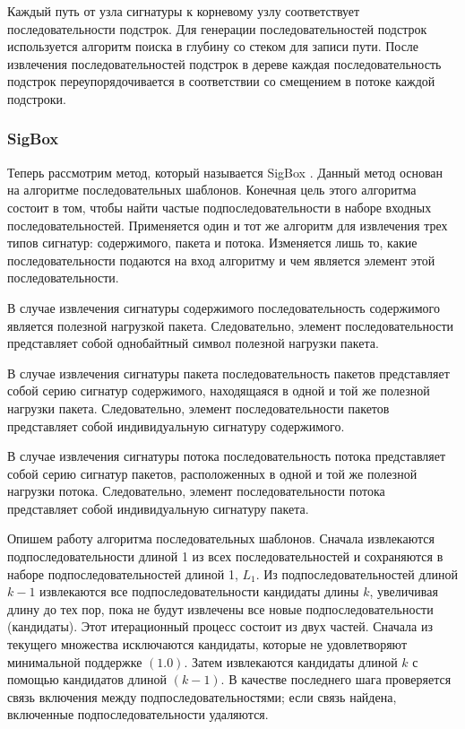 Каждый путь от узла сигнатуры к корневому узлу соответствует последовательности подстрок.
Для генерации последовательностей подстрок используется алгоритм поиска в глубину со стеком для записи пути.
После извлечения последовательностей подстрок в дереве каждая последовательность подстрок
переупорядочивается в соответствии со смещением в потоке каждой подстроки.

\subsubsection{SigBox}

Теперь рассмотрим метод, который называется SigBox \cite{shim2017sigbox}. Данный метод основан на алгоритме последовательных шаблонов.
Конечная цель этого алгоритма состоит в том, чтобы найти частые подпоследовательности в наборе входных последовательностей.
Применяется один и тот же алгоритм для извлечения трех типов сигнатур: содержимого, пакета и потока. Изменяется лишь то, какие последовательности
подаются на вход алгоритму и чем является элемент этой последовательности.

В случае извлечения сигнатуры содержимого последовательность содержимого является полезной нагрузкой пакета.
Следовательно, элемент последовательности представляет собой однобайтный символ полезной нагрузки пакета.

В случае извлечения сигнатуры пакета последовательность пакетов представляет собой серию сигнатур содержимого, находящаяся в одной и той же полезной нагрузки пакета.
Следовательно, элемент последовательности пакетов представляет собой индивидуальную сигнатуру содержимого.

В случае извлечения сигнатуры потока последовательность потока представляет собой серию сигнатур пакетов, расположенных в одной и той же полезной нагрузки потока.
Следовательно, элемент последовательности потока представляет собой индивидуальную сигнатуру пакета.

Опишем работу алгоритма последовательных шаблонов.
Сначала извлекаются подпоследовательности длиной 1 из всех последовательностей и сохраняются в наборе подпоследовательностей длиной 1, $L_1$.
Из подпоследовательностей длиной $k-1$ извлекаются все подпоследовательности кандидаты длины $k$,
увеличивая длину до тех пор, пока не будут извлечены все новые подпоследовательности (кандидаты).
Этот итерационный процесс состоит из двух частей.
Сначала из текущего множества исключаются кандидаты, которые не удовлетворяют минимальной поддержке $(1.0)$.
Затем извлекаются кандидаты длиной $k$ с помощью кандидатов длиной $(k-1)$.
В качестве последнего шага проверяется связь включения между подпоследовательностями; если связь найдена, включенные подпоследовательности удаляются.

